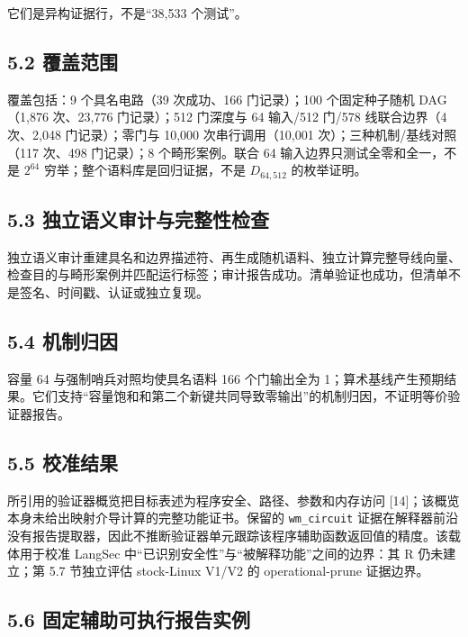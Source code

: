 \documentclass[
  11pt,
  a4paper,
]{ctexart}
\begin{document}
它们是异构证据行，不是``38,533 个测试''。

\subsection{5.2 覆盖范围}\label{52-ux8986ux76d6ux8303ux56f4}

覆盖包括：9 个具名电路（39 次成功、166 门记录）；100
个固定种子随机 DAG（1,876 次、23,776
门记录）；512 门深度与 64 输入/512 门/578 线联合边界（4 次、2,048
门记录）；零门与 10,000 次串行调用（10,001 次）；三种机制/基线对照（117
次、498 门记录）；8 个畸形案例。联合 64 输入边界只测试全零和全一，不是
\(2^{64}\) 穷举；整个语料库是回归证据，不是 \(D_{64,512}\) 的枚举证明。

\subsection{5.3 独立语义审计与完整性检查}\label{53-ux72ecux7acbux8bedux4e49ux5ba1ux8ba1ux4e0eux5b8cux6574ux6027ux68c0ux67e5}

独立语义审计重建具名和边界描述符、再生成随机语料、独立计算完整导线向量、检查目的与畸形案例并匹配运行标签；审计报告成功。清单验证也成功，但清单不是签名、时间戳、认证或独立复现。

\subsection{5.4 机制归因}\label{54-ux673aux5236ux5f52ux56e0}

容量 64 与强制哨兵对照均使具名语料 166 个门输出全为
1；算术基线产生预期结果。它们支持``容量饱和和第二个新键共同导致零输出''的机制归因，不证明等价验证器报告。

\subsection{5.5 校准结果}\label{55-ux6821ux51c6ux7ed3ux679c}

所引用的验证器概览把目标表述为程序安全、路径、参数和内存访问
{[}14{]}；该概览本身未给出映射介导计算的完整功能证书。保留的
\texttt{wm\_circuit}
证据在解释器前沿没有报告提取器，因此不推断验证器单元跟踪该程序辅助函数返回值的精度。该载体用于校准
LangSec 中``已识别安全性''与``被解释功能''之间的边界：其 R 仍未建立；第
5.7 节独立评估 stock-Linux V1/V2 的 operational-prune 证据边界。

\hypertarget{56-ux56faux5b9aux8f85ux52a9ux53efux6267ux884cux62a5ux544aux5b9eux4f8b}{%
\subsection{5.6
固定辅助可执行报告实例}\label{56-ux56faux5b9aux8f85ux52a9ux53efux6267ux884cux62a5ux544aux5b9eux4f8b}}
\end{document}

